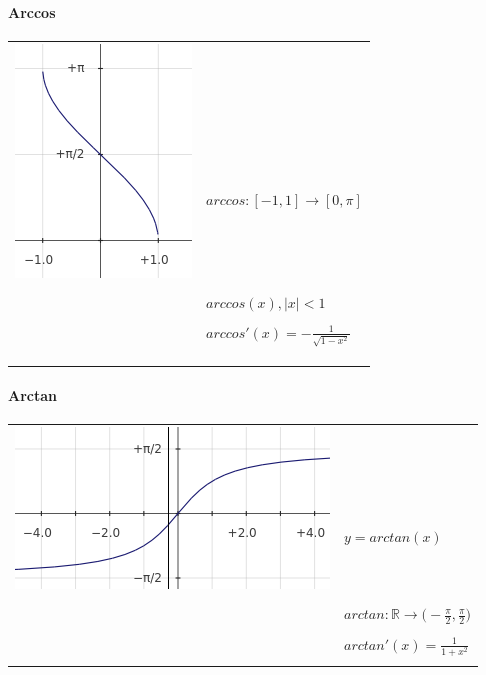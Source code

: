 \documentclass{article}
\begin{document}
\paragraph{Arccos}
\begin{tabular}{ l l }
\multirow{3}{*}{\includegraphics[scale=0.5]{png/arccos.png}} & \\ \\
 & $ arccos : [-1, 1] \to [0, \pi] $ \\ \\
 & $ arccos (x), |x|<1 $ \\ \\
 & $ arccos'(x) = -\frac{1}{\sqrt{1-x^2}} $ \\ \\ \\ \\
\hline
\end{tabular}

\vspace{2ex}

\paragraph{Arctan}
\begin{tabular}{ l l }
\multirow{3}{*}{\includegraphics[scale=0.5]{png/arctan.png}} & \\ \\
 & $ y = arctan(x) $ \\ \\
 & $ arctan : \mathbb{R} \to \big(-\frac{\pi}{2}, \frac{\pi}{2}\big) $ \\ \\
 & $ arctan'(x) = \frac{1}{1+x^2} $ \\ \\
\hline
\end{tabular}
\end{document}
